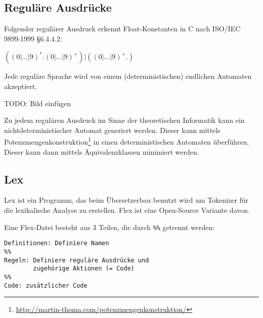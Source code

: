 \begin{beispiel}
\end{beispiel}

\subsection{Reguläre Ausdrücke}
\begin{beispiel}
	Folgender regulärer Ausdruck erkennt Float-Konstanten in C nach
	ISO/IEC 9899:1999 §6.4.4.2:

	$((0|\dots|9)^*.(0|\dots|9)^+)|((0|\dots|9)^+.)$
\end{beispiel}

\begin{satz}
	Jede reguläre Sprache wird von einem (deterministischen) endlichen
	Automaten akzeptiert.
\end{satz}

TODO: Bild einfügen

Zu jedem regulären Ausdruck im Sinne der theoretischen Informatik kann ein 
nichtdeterministischer Automat generiert werden. Dieser kann mittels 
Potenzmengenkonstruktion\footnote{\url{http://martin-thoma.com/potenzmengenkonstruktion/}} 
in einen deterministischen Automaten überführen. Dieser kann dann mittels 
Äquivalenzklassen minimiert werden.


\subsection{Lex}
Lex ist ein Programm, das beim Übersetzerbau benutzt wird um Tokenizer für die
lexikalische Analyse zu erstellen. Flex ist eine Open-Source Variante davon.

Eine Flex-Datei besteht aus 3 Teilen, die durch \texttt{\%\%} getrennt werden:

\begin{verbatim}
Definitionen: Definiere Namen
%%
Regeln: Definiere reguläre Ausdrücke und 
        zugehörige Aktionen (= Code)
%%
Code: zusätzlicher Code
\end{verbatim}

